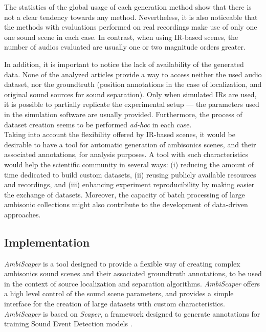 The statistics of the global usage of each generation method show that there is not a clear tendency towards any method.
Nevertheless, it is also noticeable that the methods with evaluations performed on real recordings make use of only one one sound scene in each case. In contrast, when using IR-based scenes, the number of audios evaluated are usually one or two magnitude orders greater. 

In addition, it is important to notice the lack of availability of the generated data. None of the analyzed articles provide a way to access neither the used audio dataset, nor the groundtruth (position annotations in the case of localization, and original sound sources for sound separation). 
Only when simulated IRs are used, it is possible to partially replicate the experimental setup --- the parameters used in the simulation software are usually provided. 
Furthermore, the process of dataset creation seems to be performed \textit{ad-hoc} in each case. \\

Taking into account the flexibility offered by IR-based scenes, it would be desirable to have a tool for automatic generation of ambisonics scenes, and their associated annotations, for analysis purposes.
A tool with such characteristics would help the scientific community in several ways: (i) reducing the amount of time dedicated to build custom datasets, (ii) reusing publicly available resources and recordings, and (iii) enhancing experiment reproducibility by making easier the exchange of datasets. 
Moreover, the capacity of batch processing of large ambisonic collections might also contribute to the development of data-driven approaches.


\subsection{Implementation}
\label{sec:ambiscaper}

\textit{AmbiScaper} is a tool designed to provide a flexible way of creating complex ambisonics sound scenes and their associated groundtruth annotations, to be used in the context of source localization and separation algorithms.
\textit{AmbiScaper} offers a high level control of the sound scene parameters, and provides a simple interface for the creation of large datasets with custom characteristics.
\textit{AmbiScaper} is based on \textit{Scaper}, a framework designed to generate annotations for training Sound Event Detection models \cite{Salamon2017}.\\

